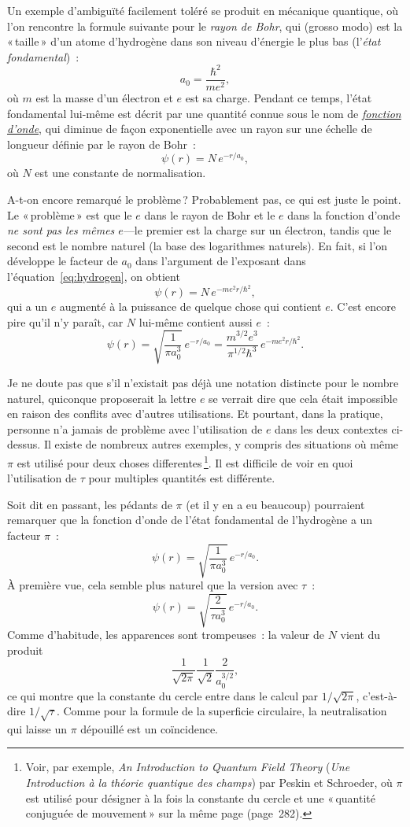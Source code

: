 Un exemple d'ambiguïté facilement toléré se produit en mécanique quantique, où
l'on rencontre la formule suivante pour le \emph{rayon de Bohr}, qui (grosso
modo) est la «\,taille\,» d'un atome d'hydrogène dans son niveau d'énergie le
plus bas (l'\emph{état fondamental})~:
\[
a_0 = \frac{\hbar^2}{m e^2},
\]
où $m$ est la masse d'un électron et $e$ est sa charge. Pendant ce temps, l'état
fondamental lui-même est décrit par une quantité connue sous le nom de
\href{https://fr.wikipedia.org/wiki/Fonction_d%27onde}{\emph{fonction d'onde}},
qui diminue de façon exponentielle avec un rayon sur une échelle de longueur
définie par le rayon de Bohr~:
\begin{equation}
\label{eq:hydrogen}
\psi(r) = N\,e^{-r/a_0},
\end{equation}
où $N$ est une constante de normalisation.

A-t-on encore remarqué le problème\,? Probablement pas, ce qui est juste le
point. Le «\,problème\,» est que le $e$ dans le rayon de Bohr et le $e$ dans la
fonction d'onde \emph{ne sont pas les mêmes $e$}---le premier est la charge sur
un électron, tandis que le second est le nombre naturel (la base des logarithmes
naturels). En fait, si l'on développe le facteur de $a_0$ dans l'argument de
l'exposant dans l'équation~\eqref{eq:hydrogen}, on obtient
\[
\psi(r) = N\,e^{-m e^2 r/\hbar^2},
\]
qui a un $e$ augmenté à la puissance de quelque chose qui contient $e$. C'est
encore pire qu'il n'y paraît, car $N$ lui-même contient aussi $e$~:
\[
\psi(r) = \sqrt{\frac{1}{\pi a_0^3}}\,e^{-r/a_0} =
\frac{m^{3/2} e^3}{\pi^{1/2} \hbar^3}\,e^{-m e^2 r/\hbar^2}.
\]

Je ne doute pas que s'il n'existait pas déjà une notation distincte pour le
nombre naturel, quiconque proposerait la lettre $e$ se verrait dire que cela
était impossible en raison des conflits avec d'autres utilisations. Et pourtant,
dans la pratique, personne n'a jamais de problème avec l'utilisation de $e$ dans
les deux contextes ci-dessus. Il existe de nombreux autres exemples, y compris
des situations où même $\pi$ est utilisé pour deux choses
differentes\,\footnote{Voir, par exemple, \emph{An Introduction to Quantum Field
Theory} (\emph{Une Introduction à la théorie quantique des champs}) par Peskin
et Schroeder, où $\pi$ est utilisé pour désigner à la fois la constante du
cercle et une «\,quantité conjuguée de mouvement\,» sur la même page
(page~282).}. Il est difficile de voir en quoi l'utilisation de $\tau$ pour
multiples quantités est différente.

Soit dit en passant, les pédants de $\pi$ (et il y en a eu beaucoup) pourraient
remarquer que la fonction d'onde de l'état fondamental de l'hydrogène a un
facteur $\pi$~:
\[
\psi(r) = \sqrt{\frac{1}{\pi a_0^3}}\,e^{-r/a_0}.
\]
À première vue, cela semble plus naturel que la version avec $\tau$~:
\[
\psi(r) = \sqrt{\frac{2}{\tau a_0^3}}\,e^{-r/a_0}.
\]
Comme d'habitude, les apparences sont trompeuses~: la valeur de $N$ vient du
produit
\[
\frac{1}{\sqrt{2\pi}} \frac{1}{\sqrt{2}} \frac{2}{a_0^{3/2}},
\]
ce qui montre que la constante du cercle entre dans le calcul par
$1/\sqrt{2\pi}$, c'est-à-dire $1/\sqrt{\tau}$. Comme pour la formule de la
superficie circulaire, la neutralisation qui laisse un $\pi$ dépouillé est un
coïncidence.

